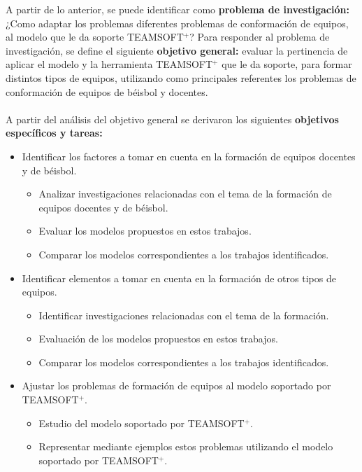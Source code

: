 A partir de lo anterior, se puede identificar como \textbf{problema de investigación:} ¿Como adaptar los problemas diferentes problemas de conformación de equipos, al modelo que le da soporte TEAMSOFT$^+$? Para responder al problema de investigación, se define el siguiente \textbf{objetivo general:} evaluar la pertinencia de aplicar el modelo y la herramienta TEAMSOFT$^+$ que le da soporte, para formar distintos tipos de equipos, utilizando como principales referentes los problemas de conformación de equipos de béisbol y docentes.\\\\
A partir del análisis del objetivo general se derivaron los siguientes \textbf{objetivos específicos y tareas:}
\begin{itemize}		
	\item Identificar los factores a tomar en cuenta en la formación de equipos docentes y de béisbol.
		\begin{itemize}
			\item Analizar investigaciones relacionadas con el tema de la formación de equipos docentes y de béisbol.
			\item Evaluar los modelos propuestos en estos trabajos.
			\item Comparar los modelos correspondientes a los trabajos identificados.
		\end{itemize}
		
	\item Identificar elementos a tomar en cuenta en la formación de otros tipos de equipos.
	\begin{itemize}
		\item Identificar investigaciones relacionadas con el tema de la formación.
		\item Evaluación de los modelos propuestos en estos trabajos.
		\item Comparar los modelos correspondientes a los trabajos identificados.
	\end{itemize}	
	
	\item Ajustar los problemas de formación de equipos al modelo soportado por TEAMSOFT$^+$.
		\begin{itemize}
			\item Estudio del modelo soportado por TEAMSOFT$^+$.
			\item Representar mediante ejemplos estos problemas utilizando el modelo soportado por TEAMSOFT$^+$.
		\end{itemize}
		

\end{itemize}
